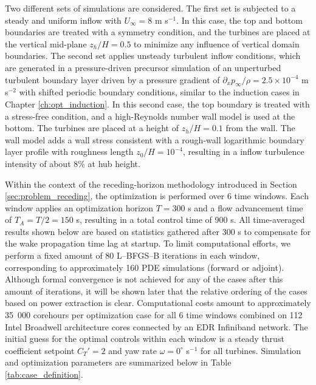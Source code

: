 Two different sets of simulations are considered. The first set is subjected to a steady and uniform inflow with $U_\infty = 8$ m s$^{-1}$. In this case, the top and bottom boundaries are treated with a symmetry condition, and the turbines are placed at the vertical mid-plane $z_h/H = 0.5$ to minimize any influence of vertical domain boundaries. The second set applies unsteady turbulent inflow conditions, which are generated in a pressure-driven precursor simulation of an unperturbed turbulent boundary layer driven by a pressure gradient of $\partial_x p_\infty/\rho = 2.5 \times 10^{-4}$ m s$^{-2}$ with shifted periodic boundary conditions, similar to the induction cases in Chapter \ref{ch:opt_induction}. In this second case, the top boundary is treated with a stress-free condition, and a high-Reynolds number wall model is used at the bottom. The turbines are placed at a height of $z_h/H = 0.1$ from the wall. The wall model adds a wall stress consistent with a rough-wall logarithmic boundary layer profile with roughness length $z_0/H = 10^{-4}$, resulting in a inflow turbulence intensity of about 8\% at hub height. 

Within the context of the receding-horizon methodology introduced in Section \ref{sec:problem_receding}, the optimization is performed over 6 time windows. Each window applies an optimization horizon $T=300$ s and a flow advancement time of $T_A = T/2= 150$ s, resulting in a total control time of 900 s. All time-averaged results shown below are based on statistics gathered after 300 s to compensate for the wake propagation time lag at startup. To limit computational efforts, we perform a fixed amount of 80 L--BFGS--B iterations in each window, corresponding to approximately 160 PDE simulations (forward or adjoint). Although formal convergence is not achieved for any of the cases after this amount of iterations, it will be shown later that the relative ordering of the cases based on power extraction is clear. Computational costs amount to approximately 35~000 corehours per optimization case for all 6 time windows combined on 112 Intel Broadwell architecture cores connected by an EDR Infiniband network. The initial guess for the optimal controls within each window is a steady thrust coefficient setpoint $C_T'=2$  and yaw rate $\omega = 0^\circ$ s$^{-1}$ for all turbines. Simulation and optimization parameters are summarized below in Table \ref{tab:case_definition}.

